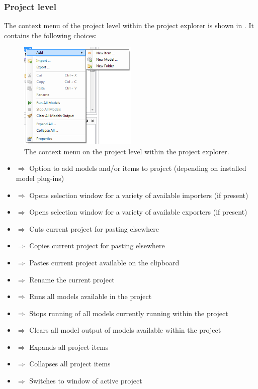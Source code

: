 \subsubsection{Project level}
\label{subsubsec:projectlevel}
The context menu of the project level within the project explorer is shown in . It contains the following choices:
%
\begin{figure} [H]
	\centering
		\includegraphics[width=0.5\textwidth]{figures/chapter_overview/context_menu_project.png}
	\caption{The context menu on the project level within the project explorer.}
	\label{fig:contextmenuproject}
\end{figure}
\begin{itemize}
	\item {} $\Rightarrow$ Option to add models and/or items to project (depending on installed model plug-ins)
	\item {} $\Rightarrow$ Opens selection window for a variety of available importers (if present)
	\item {} $\Rightarrow$ Opens selection window for a variety of available exporters (if present) 
	\item {} $\Rightarrow$ Cuts current project for pasting elsewhere
	\item {} $\Rightarrow$ Copies current project for pasting elsewhere
	\item {} $\Rightarrow$ Pastes current project available on the clipboard
	\item {} $\Rightarrow$ Rename the current project
	\item {} $\Rightarrow$ Runs all models available in the project
	\item {} $\Rightarrow$ Stops running of all models currently running within the project
	\item {} $\Rightarrow$ Clears all model output of models available within the project
	\item {} $\Rightarrow$ Expands all project items
	\item {} $\Rightarrow$ Collapses all project items
	\item {} $\Rightarrow$ Switches to  window of active project
\end{itemize}
